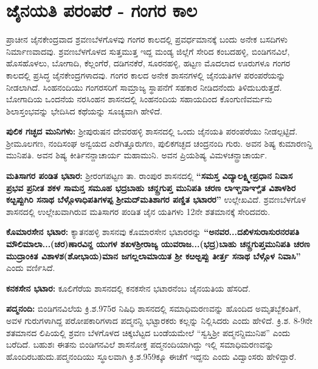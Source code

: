 \section*{ಜೈನಯತಿ ಪರಂಪರೆ - ಗಂಗರ ಕಾಲ}

ಪ್ರಾಚೀನ ಜೈನಕೇಂದ್ರವಾದ ಶ್ರವಣಬೆಳಗೊಳವು ಗಂಗರ ಕಾಲದಲ್ಲಿ ಪ್ರವರ್ಧಮಾನಕ್ಕೆ ಬಂದು ಅನೇಕ ಬಸದಿಗಳು ನಿರ್ಮಾಣ\-ವಾದವು. ಶ್ರವಣಬೆಳಗೊಳದ ಸುತ್ತಮುತ್ತ ಇದ್ದ ಮಂಡ್ಯ ಜಿಲ್ಲೆಗೆ ಸೇರಿದ ಕಂಬದಹಳ್ಳಿ, ಬಿಂಡಿಗನವಿಲೆ, ಹೊಸಹೊಳಲು, ಬೋಗಾದಿ, ಕೆಲ್ಲಂಗೆರೆ, ದಡಿಗನಕೆರೆ, ಸೂರನಹಳ್ಳಿ, ಹಟ್ಟಣ ಮೊದಲಾದ ಊರುಗಳೂ ಗಂಗರ ಕಾಲದಲ್ಲಿ ಪ್ರಸಿದ್ಧ ಜೈನಕೇಂದ್ರ\-ಗಳಾದವು. ಗಂಗರ ಕಾಲದ ಅನೇಕ ಶಾಸನಗಳಲ್ಲಿ ಜೈನಯತಿಗಳ ಪರಂಪರೆಯನ್ನು ನೀಡಲಾಗಿದೆ. ಸಿಂಹನಂದಿಯು ಗಂಗರಸರಿಗೆ ಸಾಮ್ರಾಜ್ಯ ಸ್ಥಾಪನೆಗೆ ಸಹಕಾರ ನೀಡಿದನೆಂದು ತಿಳಿದುಬರುತ್ತದೆ. ಬೋಗಾದಿಯ ಒಂದನೆಯ ನರಸಿಂಹನ ಶಾಸನದಲ್ಲಿ ಸಿಂಹನಂದಿಯ ಸಹಾಯದಿಂದ ಕೊಂಗುಣಿವರ್ಮನು ಶಿಲಾಸ್ತಂಭವನ್ನು ಭೇದಿಸಿದ ಕಥೆಯನ್ನು ಸೂಚ್ಯವಾಗಿ ಹೇಳಿದೆ.

\textbf{ಪುಲಿಕ ಗಚ್ಛದ ಮುನಿಗಳು:} ಶ‍್ರೀಪುರುಷನ ದೇವರಹಳ್ಳಿ ಶಾಸನದಲ್ಲಿ ಒಂದು ಜೈನಯತಿ ಪರಂಪರೆಯು ನೀಡಲ್ಪಟ್ಟಿದೆ. ಶ‍್ರೀಮೂಲಗಣ, ನಂದಿಸಂಘ ಅನ್ವಯದ ಎರೆಗಿತ್ತೂರುಗಣ, ಪುಲಿಕಗಚ್ಛದ ಚಂದ್ರನಂದಿ ಗುರು. ಅವನ ಶಿಷ್ಯ ಕುಮಾರಣನ್ದಿ ಮುನಿಪತಿ. ಅವನ ಶಿಷ್ಯ ಕೀರ್ತಿನನ್ದಾಚಾರ್ಯ ಮಹಾಮುನಿ. ಅವನ ಪ್ರಿಯಶಿಷ್ಯ ವಿಮಳಚನ್ದ್ರಾಚಾರ್ಯ.

\textbf{ಮತಿಸಾಗರ ಪಂಡಿತ ಭಟಾರ:} ಶ‍್ರೀರಂಗಪಟ್ಟಣ ತಾ. ರಾಂಪುರ ಶಾಸನದಲ್ಲಿ \textbf{“ಸಮಸ್ತ ವಿದ್ಯಾಲಕ್ಷ್ಮೀಪ್ರಧಾನ ನಿವಾಸ ಪ್ರಭವ ಪ್ರನೀತ ಶಕಳ ಸಾಮನ್ತ ಸಮೂಹ ಭದ್ರಬಾಹು ಚನ್ದ್ರಗುಪ್ತ ಮುನಿಪತಿ ಚರಣ ಲಾಞ್ಚನಾಞ್ಚಿತ ವಿಶಾಳಶಿರ ಕೞ್ಬಪ್ಪುಗಿರಿ ಸನಾಥ ಬೆಳ್ಗೊಳಾಧಿಪತಿಗಳಪ್ಪ ಶ‍್ರೀಮದ್​ ಮತಿಶಾಗರ ಪಣ್ಡಿತ ಭಟಾರರ”} ಉಲ್ಲೇಖವಿದೆ. ಶ್ರವಣಬೆಳಗೊಳ ಶಾಸನದಲ್ಲಿ ಉಲ್ಲೇಖವಾಗಿರುವ ಮತಿಸಾಗರ ಪಂಡಿತ ಜೈನ ಯತಿಗಳು 12ನೇ ಶತಮಾನಕ್ಕೆ ಸೇರಿದವರು.

\textbf{ಕೊಮಾರಸೇನ ಭಟಾರ:} ಕ್ಯಾತನಹಳ್ಳಿ ಶಾಸನವು ಕೊಮಾರಸೇನ ಭಟಾರರನ್ನು \textbf{“ಅನವರ...ದಖಿಳಸುರಾಸುರನರಪತಿ ಮೌಲಿಮಾಲಾ...(ಚರ)ಣಾರವಿನ್ದ ಯುಗಳ ಶಖಳಶ‍್ರೀರಾಜ್ಯ ಯುವರಾಜ...(ಭದ್ರ)ಬಾಹು ಚನ್ದ್ರಗುಪ್ತಮುನಿಪತಿ ಚರಣ ಮುದ್ರಾಂಕಿತ ವಿಶಾಳಶ(ಶೋಭಾಯ)ಮಾನ ಜಗಲ್ಲಲಾಮಾಯಿತ ಶ‍್ರೀ ಕೞಅ್ಬಪ್ಪು ತೀರ್ತ್ತ ಸನಾಥ ಬೆಳ್ಗೊಳ ನಿವಾಸಿ”} ಎಂದು ವರ್ಣಿಸಿದೆ.

\textbf{ಕನಕಸೇನ ಭಟಾರ:} ಕೂಲಿಗೆರೆಯ ಶಾಸನದಲ್ಲಿ ಕನಕಸೇನ ಭಟಾರನೆಂಬ ಜೈನಯತಿಯ ಹೆಸರಿದೆ.

\newpage

\textbf{ಪದ್ಮನಂದಿ:} ಬಿಂಡಿಗನವಿಲೆಯ ಕ್ರಿ.ಶ.975ರ ನಿಷಿಧಿ ಶಾಸನದಲ್ಲಿ ಸಮಾಧಿಮರಣವನ್ನು ಹೊಂದಿದ ಅಮೃತಬ್ಬೆಕಂತಿಗೆ, ಅವಳ ಗುರುಗಳಾಗಿದ್ದ ಪರೋಪಕಾರಿಗಳಾದ ಪದ್ಮನನ್ದಿ ಭಟ್ಟಾರಕರು ಕಲ್ಲನ್ನು ನಿಲ್ಲಿಸಿದರು ಎಂದು ಹೇಳಿದೆ. ಕ್ರಿ.ಶ. 8-9ನೇ ಶತಮಾನದ ಲಿಪಿಯಲ್ಲಿ ಶ್ರವಣ ಬೆಳಗೊಳದ ಚಿಕ್ಕಬೆಟ್ಟದ ಬಂಡೆಯಮೇಲೆ “ಸ್ವಸ್ತಿಶ‍್ರೀ ಪದ್ಮನನ್ದಿಮುನಿಪ” ಎಂದು ಬರೆದಿದೆ. ಬಹುಶಃ ಈತನು ಬಿಂಡಿಗನವಿಲೆ ಶಾಸನೋಕ್ತ ಪದ್ಮನಂದಿಯಾಗಿದ್ದು ಇಲ್ಲಿ ಸಮಾಧಿಮರಣವನ್ನು ಹೊಂದಿರಬಹುದು.\break \hbox{ಪದ್ಮನಂದಿಯು} ಸ್ಥೂಲವಾಗಿ ಕ್ರಿ.ಶ.959ಕ್ಕೂ ಈಚೆಗೆ ಇದ್ದನು ಎಂದು ವಿದ್ವಾಂಸರು ಹೇಳಿದ್ದಾರೆ.

